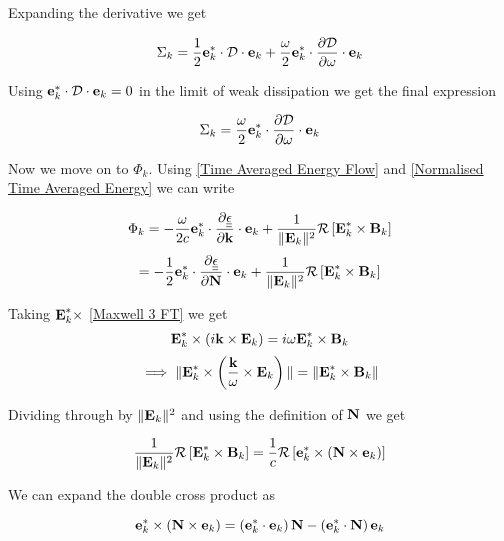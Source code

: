 Expanding the derivative we get

\begin{equation}
	\Sigma_k = \frac{1}{2} \textbf{e}_k^* \cdot \mathcal{D} \cdot \textbf{e}_k + \frac{\omega}{2} \textbf{e}_k^* \cdot \frac{\partial \mathcal{D}}{\partial \omega} \cdot \textbf{e}_k
\end{equation}

Using $\textbf{e}_k^* \cdot \mathcal{D} \cdot \textbf{e}_k = 0$ in the limit of weak dissipation we get the final expression

\begin{equation} \label{Normalised Wave Energy Density}
	\Sigma_k = \frac{\omega}{2} \textbf{e}_k^* \cdot \frac{\partial \mathcal{D}}{\partial \omega} \cdot \textbf{e}_k
\end{equation}

Now we move on to $\Phi_k$. Using \eqref{Time Averaged Energy Flow} and \eqref{Normalised Time Averaged Energy} we can write

\begin{equation*}
	\Phi_k = -\frac{\omega}{2c} \textbf{e}_k^* \cdot \frac{\partial \underline{\underline{\epsilon}}}{\partial \textbf{k}} \cdot \textbf{e}_k + \frac{1}{\|\textbf{E}_k\|^2} \mathcal{R} \left[ \textbf{E}_k^* \times \textbf{B}_k \right]
\end{equation*}
\begin{equation}
	= - \frac{1}{2} \textbf{e}_k^* \cdot \frac{\partial \underline{\underline{\epsilon}}}{\partial \textbf{N}} \cdot \textbf{e}_k + \frac{1}{\|\textbf{E}_k\|^2} \mathcal{R} \left[ \textbf{E}_k^* \times \textbf{B}_k \right]
\end{equation}

Taking $\textbf{E}_k^* \times$ \eqref{Maxwell 3 FT} we get
\begin{equation*}
	\textbf{E}_k^* \times \left( i\textbf{k} \times \textbf{E}_k \right) = i \omega \textbf{E}_k^* \times \textbf{B}_k
\end{equation*}
\begin{equation}
	\implies \|\textbf{E}_k^* \times \left( \frac{\textbf{k}}{\omega} \times \textbf{E}_k \right)\| = \|\textbf{E}_k^* \times \textbf{B}_k\|
\end{equation}

Dividing through by $\|\textbf{E}_k\|^2$ and using the definition of $\textbf{N}$ we get

\begin{equation}
	\frac{1}{\|\textbf{E}_k\|^2} \mathcal{R} \left[ \textbf{E}_k^* \times \textbf{B}_k \right] = \frac{1}{c} \mathcal{R} \left[ \textbf{e}_k^* \times \left( \textbf{N} \times \textbf{e}_k \right) \right]
\end{equation}

We can expand the double cross product as

\begin{equation}
	\textbf{e}_k^* \times \left( \textbf{N} \times \textbf{e}_k \right) = \left( \textbf{e}_k^* \cdot \textbf{e}_k \right) \textbf{N} - \left( \textbf{e}_k^* \cdot \textbf{N} \right) \textbf{e}_k
\end{equation}

